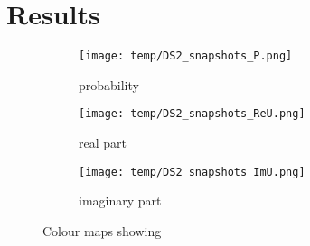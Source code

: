 \section{Results}\label{sec:results}



\clearpage
\newpage

\onecolumngrid

\begin{figure*}
    \centering
    \begin{subfigure}{0.96\textwidth}
        \texttt{[image: temp/DS2\_snapshots\_P.png]}
        \caption{probability}
        \label{fig:snapshots_p_DS2}
    \end{subfigure}
    \hfill
    \begin{subfigure}{0.96\textwidth}
        \texttt{[image: temp/DS2\_snapshots\_ReU.png]}
        \caption{real part}
        \label{fig:snapshots_ReU_DS2}
    \end{subfigure}
    \hfill
    \begin{subfigure}{0.96\textwidth}
        \texttt{[image: temp/DS2\_snapshots\_ImU.png]}
        \caption{imaginary part}
        \label{fig:snapshots_ImU_DS2}
    \end{subfigure}
       \caption{Colour maps showing }
       \label{fig:snapshots_DS2}
\end{figure*}


\twocolumngrid


